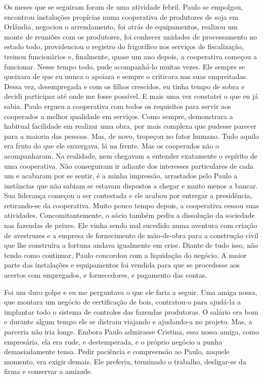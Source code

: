 Os meses que se seguiram foram de uma atividade febril.
Paulo se empolgou, encontrou instalações propícias numa cooperativa de produtores de soja em Orlândia, negociou o arrendamento, foi atrás de equipamentos, realizou um monte de reuniões com os produtores, foi conhecer unidades de processamento no estado todo, providenciou o registro do frigorífico nos serviços de fiscalização, treinou funcionários e, finalmente, quase um ano depois, a cooperativa começou a funcionar.
Nesse tempo todo, pude acompanhá-lo muitas vezes.
Ele sempre se queixara de que eu nunca o apoiara e sempre o criticara nas suas empreitadas.
Dessa vez, desempregada e com os filhos crescidos, eu tinha tempo de sobra e decidi participar até onde me fosse possível.
E mais uma vez constatei o que eu já sabia.
Paulo ergueu a cooperativa com todos os requisitos para servir aos cooperados a melhor qualidade em serviços.
Como sempre, demonstrara a habitual facilidade em realizar uma obra, por mais complexa que pudesse parecer para a maioria das pessoas.
Mas, de novo, tropeçou no fator humano.
Tudo aquilo era fruto do que ele enxergava, lá na frente.
Mas os cooperados não o acompanharam.
Na realidade, nem chegavam a entender exatamente o espírito de uma cooperativa.
Não conseguiram ir adiante dos interesses particulares de cada um e acabaram por se sentir, é a minha impressão, arrastados pelo Paulo a instâncias que não sabiam se estavam dispostos a chegar e muito menos a bancar.
Sua liderança começou a ser contestada e ele acabou por entregar a presidência, retirando-se da cooperativa.
Muito pouco tempo depois, a cooperativa cessou suas atividades.
Concomitantemente, o sócio também pediu a dissolução da sociedade nas fazendas de peixes.
Ele vinha sendo mal sucedido numa aventura com criação de avestruzes e a empresa de fornecimento de mão-de-obra para a construção civil que lhe construíra a fortuna andava igualmente em crise.
Diante de tudo isso, não tendo como continuar, Paulo concordou com a liquidação do negócio.
A maior parte das instalações e equipamentos foi vendida para que se procedesse aos acertos com empregados, e fornecedores, e pagamento das contas.

Foi um duro golpe e eu me perguntava o que ele faria a seguir.
Uma amiga nossa, que montara um negócio de certificação de bois, contratou-o para ajudá-la a implantar todo o sistema de controles das fazendas produtoras.
O salário era bom e durante algum tempo ele se distraiu viajando e ajudando-a no projeto.
Mas, a parceria não iria longe.
Embora Paulo admirasse Cristina, essa nossa amiga, como empresária, ela era rude, e destemperada, e o próprio negócio a punha demasiadamente tensa.
Pedir paciência e compreensão ao Paulo, naquele momento, era exigir demais.
Ele preferiu, terminado o trabalho, desligar-se da firma e conservar a amizade.

